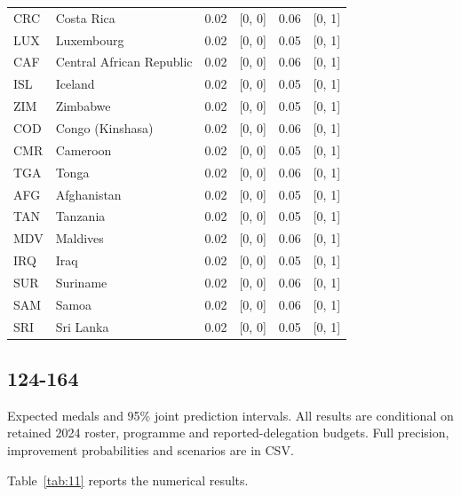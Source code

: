\documentclass[11pt,a4paper]{article}
\begin{document}
{\begin{longtable}{@{}L{1.098cm} L{4.464cm} R{1.463cm} R{2.195cm} R{1.610cm} R{2.342cm}@{}}
CRC & Costa Rica & 0.02 & [0, 0] & 0.06 & [0, 1]\\
LUX & Luxembourg & 0.02 & [0, 0] & 0.05 & [0, 1]\\
CAF & Central African Republic & 0.02 & [0, 0] & 0.06 & [0, 1]\\
ISL & Iceland & 0.02 & [0, 0] & 0.05 & [0, 1]\\
ZIM & Zimbabwe & 0.02 & [0, 0] & 0.05 & [0, 1]\\
COD & Congo (Kinshasa) & 0.02 & [0, 0] & 0.06 & [0, 1]\\
CMR & Cameroon & 0.02 & [0, 0] & 0.05 & [0, 1]\\
TGA & Tonga & 0.02 & [0, 0] & 0.06 & [0, 1]\\
AFG & Afghanistan & 0.02 & [0, 0] & 0.05 & [0, 1]\\
TAN & Tanzania & 0.02 & [0, 0] & 0.05 & [0, 1]\\
MDV & Maldives & 0.02 & [0, 0] & 0.06 & [0, 1]\\
IRQ & Iraq & 0.02 & [0, 0] & 0.05 & [0, 1]\\
SUR & Suriname & 0.02 & [0, 0] & 0.06 & [0, 1]\\
SAM & Samoa & 0.02 & [0, 0] & 0.06 & [0, 1]\\
SRI & Sri Lanka & 0.02 & [0, 0] & 0.05 & [0, 1]\\
\bottomrule
\end{longtable}}
\par{}
\clearpage
\subsection*{124-164}
Expected medals and 95\% joint prediction intervals. All results are conditional on retained 2024 roster, programme and reported-delegation budgets. Full precision, improvement probabilities and scenarios are in CSV.

Table~\ref{tab:11} reports the numerical results.
\end{document}
